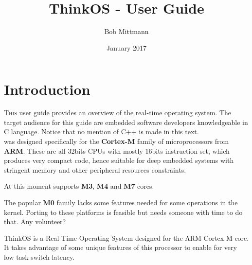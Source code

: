 

\makeatletter         
\title{ThinkOS - User Guide}
\author{Bob Mittmann}
\date{January 2017}
\def\email{bobmittmann@gmail.com} %
\def\therevision{0.2} %
\let\thetitle\@title %
\makeatother



\maketitle
\thispagestyle{empty}
\newpage
{}
\tableofcontents
\newpage
\listoffigures
\newpage
\listoftables
\newpage

\begin{versionhistory}
\end{versionhistory}

\newpage
{}

\section{Introduction}

\lettrine{T}{his} user guide provides an overview of the \ThinkOS real-time operating system. The target audience for this guide are embedded software developers knowledgeable in C language. Notice that no mention of C++ is made in this text.\\

\ThinkOS was designed specifically for the \textbf{Cortex-M} family of microprocessors from \textbf{ARM}. These are all 32bits CPUs with mostly 16bits instruction set, which produces very compact code, hence suitable for deep embedded systems with stringent memory and other peripheral resources constraints.

At this moment \ThinkOS supports \textbf{M3}, \textbf{M4} and \textbf{M7} cores.

The popular \textbf{M0} family lacks some features needed for some operations in the kernel. Porting to these platforms is feasible but needs someone with time to do that. Any volunteer?

ThinkOS is a Real Time Operating System designed for the ARM Cortex-M core. It takes advantage of some unique features of this processor to enable for very low task switch latency.


